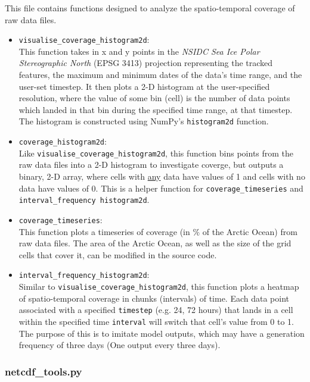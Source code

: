 \documentclass{article}
\begin{document}
            This file contains functions designed to analyze the spatio-temporal coverage of raw data files.
            \begin{itemize}
                \item \verb?visualise_coverage_histogram2d?: \\ This function takes in x and y points in the \textit{NSIDC Sea Ice Polar Stereographic North} (EPSG 3413) projection representing the tracked features, the maximum and minimum dates of the data's time range, and the user-set timestep. It then plots a 2-D histogram at the user-specified resolution, where the value of some bin (cell) is the number of data points which landed in that bin during the specified time range, at that timestep. The histogram is constructed using NumPy's \verb?histogram2d? function.
                \item \verb?coverage_histogram2d?: \\ Like \verb?visualise_coverage_histogram2d?, this function bins points from the raw data files into a 2-D histogram to investigate coverge, but outputs a binary, 2-D array, where cells with \underline{any} data have values of 1 and cells with no data have values of 0. This is a helper function for \verb?coverage_timeseries? and \verb?interval_frequency histogram2d?.
                \item \verb?coverage_timeseries?: \\ This function plots a timeseries of coverage (in $\%$ of the Arctic Ocean) from raw data files. The area of the Arctic Ocean, as well as the size of the grid cells that cover it, can be modified in the source code.
                \item \verb?interval_frequency_histogram2d?: \\ Similar to \verb?visualise_coverage_histogram2d?, this function plots a heatmap of spatio-temporal coverage in chunks (intervals) of time. Each data point associated with a specified \verb?timestep? (e.g. 24, 72 hours) that lands in a cell within the specified time \verb?interval? will switch that cell's value from 0 to 1. The purpose of this is to imitate model outputs, which may have a generation frequency of three days (One output every three days).
            \end{itemize}

        \subsubsection{\textbf{netcdf\_tools.py}}
\end{document}
